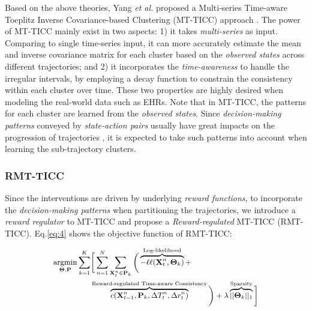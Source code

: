 \documentclass{article}
\DeclareMathOperator*{\argmin}{argmin}
\begin{document}
Based on the above theories, Yang \textit{et al.} proposed a Multi-series Time-aware Toeplitz Inverse Covariance-based Clustering (MT-TICC) approach \cite{yang2021multi}. The power of MT-TICC mainly exist in two aspects: 1) it takes \emph{multi-series} as input. Comparing to single time-series input, it can more accurately estimate the mean and inverse covariance matrix for each cluster based on the \textit{observed states} across different trajectories; and 2) it incorporates the \textit{time-awareness} to handle the irregular intervals, by employing a decay function to constrain the consistency within each cluster over time. These two properties are highly desired when modeling the real-world data such as EHRs. Note that in MT-TICC, the patterns for each cluster are learned from the \textit{observed states}. Since  \emph{decision-making patterns} conveyed by \emph{state-action pairs} usually have great impacts on the progression of trajectories \cite{komorowski2018artificial}, it is expected to take such patterns into account when learning the sub-trajectory clusters. 


\subsubsection{RMT-TICC}

Since the interventions are driven by underlying \emph{reward functions}, to incorporate the \emph{decision-making patterns} when partitioning the trajectories, we introduce a \emph{reward regulator} to MT-TICC and propose a \emph{Reward-regulated} MT-TICC (RMT-TICC). Eq.\eqref{eq:4} shows the objective function of RMT-TICC: 

\vspace{-0.3cm}
\begin{align} 
\small 
    \begin{split}
    \argmin_{\mathbf{\Theta}, \mathbf{P}} \sum_{k=1}^{K}
        & \bigg[ 
        \sum_{n=1}^{N} \sum_{\mathbf{X}_{t}^{n} \in \mathbf{P}_{k}}
        \bigg(\overbrace{-\ell\ell(\mathbf{X}_{t}^{n}, \mathbf{\Theta}_{k})}^{\text{Log-likelihood}} + \\
        & \overbrace{c(\mathbf{X}_{t-1}^{n}, \mathbf{P}_{k}, \Delta T_{t}^{n}, \Delta r_{t}^{n})}^{\text{Reward-regulated Time-aware Consistency}} \bigg) 
         + \lambda \overbrace{||\mathbf{\Theta}_{k}||_{1}}^{\text{Sparsity}}\bigg] 
        \label{eq:4}
    \end{split}
\end{align}
\end{document}

